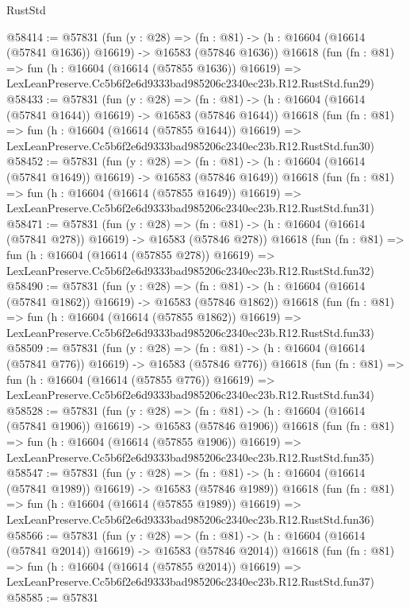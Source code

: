 \begin{lexlean}{RustStd}
\begin{coremodule}
@58414 := @57831
    (fun (y : @28) =>
    (fn : @81) -> (h : @16604 (@16614 (@57841 @1636)) @16619) -> @16583 (@57846 @1636))
    @16618
    (fun (fn : @81) =>
    fun (h : @16604 (@16614 (@57855 @1636)) @16619) =>
    LexLeanPreserve.Cc5b6f2e6d9333bad985206c2340ec23b.R12.RustStd.fun29)
@58433 := @57831
    (fun (y : @28) =>
    (fn : @81) -> (h : @16604 (@16614 (@57841 @1644)) @16619) -> @16583 (@57846 @1644))
    @16618
    (fun (fn : @81) =>
    fun (h : @16604 (@16614 (@57855 @1644)) @16619) =>
    LexLeanPreserve.Cc5b6f2e6d9333bad985206c2340ec23b.R12.RustStd.fun30)
@58452 := @57831
    (fun (y : @28) =>
    (fn : @81) -> (h : @16604 (@16614 (@57841 @1649)) @16619) -> @16583 (@57846 @1649))
    @16618
    (fun (fn : @81) =>
    fun (h : @16604 (@16614 (@57855 @1649)) @16619) =>
    LexLeanPreserve.Cc5b6f2e6d9333bad985206c2340ec23b.R12.RustStd.fun31)
@58471 := @57831
    (fun (y : @28) =>
    (fn : @81) -> (h : @16604 (@16614 (@57841 @278)) @16619) -> @16583 (@57846 @278))
    @16618
    (fun (fn : @81) =>
    fun (h : @16604 (@16614 (@57855 @278)) @16619) =>
    LexLeanPreserve.Cc5b6f2e6d9333bad985206c2340ec23b.R12.RustStd.fun32)
@58490 := @57831
    (fun (y : @28) =>
    (fn : @81) -> (h : @16604 (@16614 (@57841 @1862)) @16619) -> @16583 (@57846 @1862))
    @16618
    (fun (fn : @81) =>
    fun (h : @16604 (@16614 (@57855 @1862)) @16619) =>
    LexLeanPreserve.Cc5b6f2e6d9333bad985206c2340ec23b.R12.RustStd.fun33)
@58509 := @57831
    (fun (y : @28) =>
    (fn : @81) -> (h : @16604 (@16614 (@57841 @776)) @16619) -> @16583 (@57846 @776))
    @16618
    (fun (fn : @81) =>
    fun (h : @16604 (@16614 (@57855 @776)) @16619) =>
    LexLeanPreserve.Cc5b6f2e6d9333bad985206c2340ec23b.R12.RustStd.fun34)
@58528 := @57831
    (fun (y : @28) =>
    (fn : @81) -> (h : @16604 (@16614 (@57841 @1906)) @16619) -> @16583 (@57846 @1906))
    @16618
    (fun (fn : @81) =>
    fun (h : @16604 (@16614 (@57855 @1906)) @16619) =>
    LexLeanPreserve.Cc5b6f2e6d9333bad985206c2340ec23b.R12.RustStd.fun35)
@58547 := @57831
    (fun (y : @28) =>
    (fn : @81) -> (h : @16604 (@16614 (@57841 @1989)) @16619) -> @16583 (@57846 @1989))
    @16618
    (fun (fn : @81) =>
    fun (h : @16604 (@16614 (@57855 @1989)) @16619) =>
    LexLeanPreserve.Cc5b6f2e6d9333bad985206c2340ec23b.R12.RustStd.fun36)
@58566 := @57831
    (fun (y : @28) =>
    (fn : @81) -> (h : @16604 (@16614 (@57841 @2014)) @16619) -> @16583 (@57846 @2014))
    @16618
    (fun (fn : @81) =>
    fun (h : @16604 (@16614 (@57855 @2014)) @16619) =>
    LexLeanPreserve.Cc5b6f2e6d9333bad985206c2340ec23b.R12.RustStd.fun37)
@58585 := @57831

\end{coremodule}
\end{lexlean}
